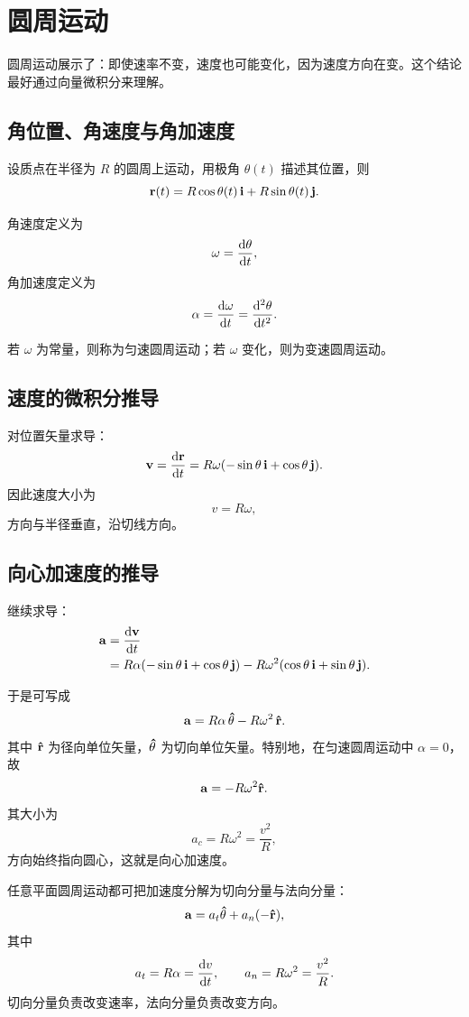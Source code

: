\section{圆周运动}

圆周运动展示了：即使速率不变，速度也可能变化，因为速度方向在变。这个结论最好通过向量微积分来理解。

\subsection{角位置、角速度与角加速度}

设质点在半径为 $R$ 的圆周上运动，用极角 $\theta(t)$ 描述其位置，则
\[
\vb{r}(t)=R\cos\theta(t)\,\vb{i}+R\sin\theta(t)\,\vb{j}.
\]

\begin{definition}[角速度与角加速度]
角速度定义为
\[
 \omega=\dv{\theta}{t},
\]
角加速度定义为
\[
 \alpha=\dv{\omega}{t}=\dv[2]{\theta}{t}.
\]
\end{definition}

若 $\omega$ 为常量，则称为匀速圆周运动；若 $\omega$ 变化，则为变速圆周运动。

\subsection{速度的微积分推导}

对位置矢量求导：
\[
\vb{v}=\dv{\vb{r}}{t}
=R\omega\qty(-\sin\theta\,\vb{i}+\cos\theta\,\vb{j}).
\]
因此速度大小为
\[
 v=R\omega,
\]
方向与半径垂直，沿切线方向。

\subsection{向心加速度的推导}

继续求导：
\begin{align*}
\vb{a}
&=\dv{\vb{v}}{t}\\
&=R\alpha\qty(-\sin\theta\,\vb{i}+\cos\theta\,\vb{j})
 -R\omega^2\qty(\cos\theta\,\vb{i}+\sin\theta\,\vb{j}).
\end{align*}

于是可写成
\[
\vb{a}=R\alpha\,\vu{\theta}-R\omega^2\,\vu{r}.
\]
其中 $\vu{r}$ 为径向单位矢量，$\vu{\theta}$ 为切向单位矢量。特别地，在匀速圆周运动中 $\alpha=0$，故
\[
\vb{a}=-R\omega^2\vu{r}.
\]
其大小为
\[
 a_c=R\omega^2=\frac{v^2}{R},
\]
方向始终指向圆心，这就是向心加速度。

\begin{theorem}[圆周运动加速度分解]
任意平面圆周运动都可把加速度分解为切向分量与法向分量：
\[
\vb{a}=a_t\vu{\theta}+a_n(-\vu{r}),
\]
其中
\[
 a_t=R\alpha=\dv{v}{t},
\qquad
 a_n=R\omega^2=\frac{v^2}{R}.
\]
切向分量负责改变速率，法向分量负责改变方向。
\end{theorem}

